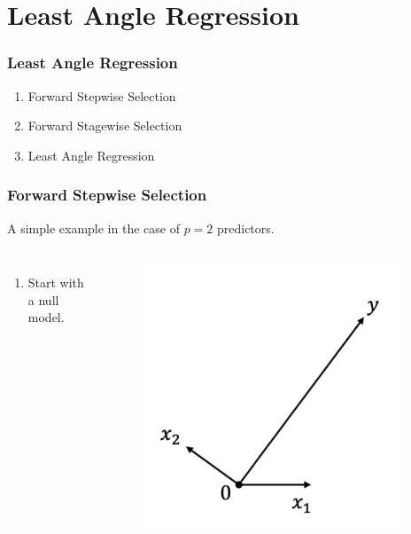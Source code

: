 \section{Least Angle Regression}
\begin{frame}
    \frametitle{Least Angle Regression}
\begin{enumerate}
    \item Forward Stepwise Selection
    \item Forward Stagewise Selection
    \item Least Angle Regression
\end{enumerate}
\end{frame}

\begin{frame}
\frametitle{Forward Stepwise Selection}
A simple example in the case of $p=2$ predictors.

\begin{columns}
    \begin{enumerate}
        \item Start with a null model.
    \end{enumerate}
    
    \begin{figure}[!htbp]
        \begin{center}
            \includegraphics[width=0.95\textwidth]{img/FStepR/1.jpeg}
        \end{center}
    \end{figure}
\end{columns}
\end{frame}

